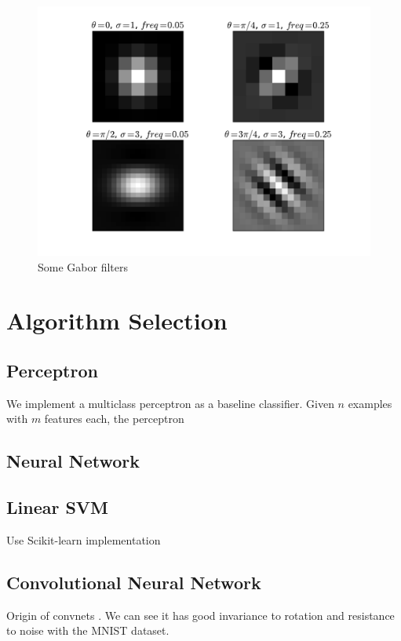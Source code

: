 \documentclass{acm_proc_article-sp}
\begin{document}
\begin{figure}[h]
	\centering
	\includegraphics[width=\linewidth]{gabors}
  	\caption{Some Gabor filters}
  	\label{fig:gabor}
\end{figure}


\section{Algorithm Selection}%
\subsection{Perceptron}
We implement a multiclass perceptron as a baseline classifier. Given $n$ examples with $m$ features each, the perceptron 

\subsection{Neural Network}

\subsection{Linear SVM}
Use Scikit-learn implementation \cite{scikit-learn}

\subsection{Convolutional Neural Network}
Origin of convnets \cite{Fukushima}. We can see it has good invariance to rotation and resistance to noise with the MNIST dataset. \cite{LeCun}
\end{document}
